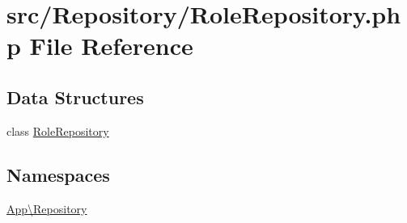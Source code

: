 \hypertarget{_role_repository_8php}{}\section{src/\+Repository/\+Role\+Repository.php File Reference}
\label{_role_repository_8php}
\subsection*{Data Structures}
\begin{DoxyCompactItemize}
\item 
class \mbox{\hyperlink{class_app_1_1_repository_1_1_role_repository}{Role\+Repository}}
\end{DoxyCompactItemize}
\subsection*{Namespaces}
\begin{DoxyCompactItemize}
\item 
 \mbox{\hyperlink{namespace_app_1_1_repository}{App\textbackslash{}\+Repository}}
\end{DoxyCompactItemize}
